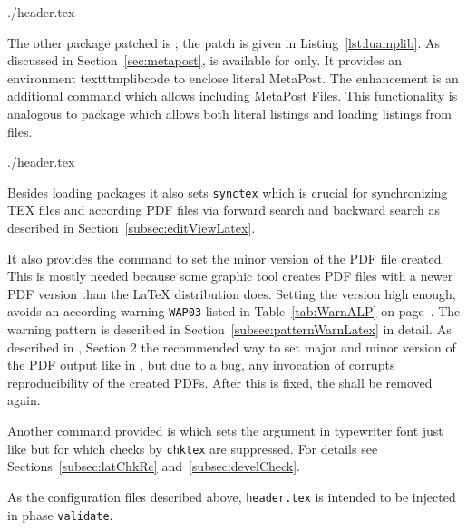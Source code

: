 %
{./header.tex}%


The other package patched is ; the patch is given in Listing~\ref{lst:luamplib}. 
As discussed in Section~\ref{sec:metapost}, 
 is available for \lualatex{} only. 
It provides an environment texttt{mplibcode} to enclose literal MetaPost. 
The enhancement is an additional command  
which allows including MetaPost Files. 
This functionality is analogous to package  
which allows both literal listings and loading listings from files. 

%

{./header.tex}%

Besides loading packages it also sets \texttt{synctex} 
which is crucial for synchronizing TEX files and according PDF files 
via forward search and backward search 
as described in Section~\ref{subsec:editViewLatex}. 


It also provides the command  to set the minor version of the PDF file created. 
This is mostly needed because some graphic tool creates PDF files with a newer PDF version 
than the \LaTeX{} distribution does. 
Setting the version high enough, avoids an according warning \texttt{WAP03} 
listed in Table~\ref{tab:WarnALP} on page~\pageref{tab:WarnALP}. 
The warning pattern is described in Section~\ref{subsec:patternWarnLatex} in detail. 
As described in \cite{DocMetaDataSuppCode}, Section 2 
the recommended way to set major and minor version of the PDF output 
like in , 
but due to a bug, any invocation of  corrupts reproducibility of the created PDFs. 
After this is fixed, the  shall be removed again. 

Another command provided is  which sets the argument in typewriter font 
just like  but for which checks by \texttt{chktex} are suppressed. 
For details see Sections~\ref{subsec:latChkRc} and~\ref{subsec:develCheck}. 
\medskip


As the configuration files described above, 
\texttt{header.tex} is intended to be injected in phase \texttt{validate}. 

